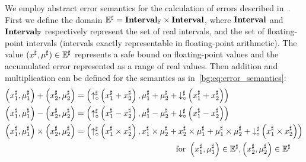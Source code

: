 We employ abstract error semantics for the calculation of errors described
in~\cite{ioualalen, martel07}. First we define the domain $\mathbb{E}^\sharp
= \mathbf{Interval}_\mathbb{F}\times\mathbf{Interval}$, where $\mathbf{Interval}$ and
$\mathbf{Interval}_\mathbb{F}$ respectively represent the set of real intervals, and
the set of floating-point intervals (intervals exactly representable in
floating-point arithmetic). The value $(x^\sharp, \mu^\sharp) \in \mathbb{E}^\sharp$
represents a safe bound on floating-point values and the accumulated error
represented as a range of real values. Then addition and multiplication can be
defined for the semantics as in~\eqref{bg:eq:error_semantics}:
\begin{equation}
    \begin{aligned}
        \left( x^\sharp_1, \mu^\sharp_1 \right) +
        \left( x^\sharp_2, \mu^\sharp_2 \right)
    &=  \left(
            \operatorname{\uparrow^\sharp_\circ}\left(x^\sharp_1 + x^\sharp_2\right),
            \mu^\sharp_1 + \mu^\sharp_2 +
            \operatorname{\downarrow^\sharp_\circ}\left(x^\sharp_1 + x^\sharp_2\right)
        \right) \\
        \left( x^\sharp_1, \mu^\sharp_1 \right) -
        \left( x^\sharp_2, \mu^\sharp_2 \right)
    &=  \left(
            \operatorname{\uparrow^\sharp_\circ}\left(x^\sharp_1 - x^\sharp_2\right),
            \mu^\sharp_1 - \mu^\sharp_2 +
            \operatorname{\downarrow^\sharp_\circ}\left(x^\sharp_1 - x^\sharp_2\right)
        \right) \\
        \left( x^\sharp_1, \mu^\sharp_1 \right) \times
        \left( x^\sharp_2, \mu^\sharp_2 \right)
    &=  \left(
            \operatorname{\uparrow^\sharp_\circ}\left(x^\sharp_1 \times x^\sharp_2\right),
            x^\sharp_1 \times \mu^\sharp_2 + x^\sharp_2 \times \mu^\sharp_1 +
            \mu^\sharp_1 \times \mu^\sharp_2 +
            \operatorname{\downarrow^\sharp_\circ}\left(x^\sharp_1 \times x^\sharp_2\right)
        \right) \\
    &\qquad\qquad\qquad\qquad\qquad\qquad\text{~for~}
        \left( x^\sharp_1, \mu^\sharp_1 \right) \in \mathbb{E}^\sharp,
        \left( x^\sharp_2, \mu^\sharp_2 \right) \in \mathbb{E}^\sharp
    \end{aligned}
    \label{bg:eq:error_semantics}
\end{equation}

